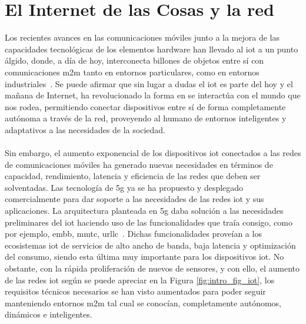 \section{El Internet de las Cosas y la red }
\label{sec:6gIoT}

Los recientes avances en las comunicaciones móviles junto a la mejora de las capacidades tecnológicas de los elementos hardware han llevado al \gls{iot} a un punto álgido, donde, a día de hoy, interconecta billones de objetos entre sí con comunicaciones \gls{m2m} tanto en entornos particulares, como en entornos industriales~\cite{Balaji2019}. Se puede afirmar que sin lugar a dudas el \gls{iot} es parte del hoy y el mañana de Internet, ha revolucionado la forma en se interactúa con el mundo que nos rodea, permitiendo conectar dispositivos entre sí de forma completamente autónoma a través de la red, proveyendo al humano de entornos inteligentes y adaptativos a las necesidades de la sociedad.\\
\\
Sin embargo, el aumento exponencial de los dispositivos \gls{iot} conectados a las redes de comunicaciones móviles ha generado nuevas necesidades en términos de capacidad, rendimiento, latencia y eficiencia de las redes que deben ser solventadas. Las tecnología de \gls{5g} ya se ha propuesto y desplegado comercialmente para dar soporte a las necesidades de las redes \gls{iot} y sus aplicaciones. La arquitectura planteada en \gls{5g} daba solución a las necesidades preliminares del \gls{iot} haciendo uso de las funcionalidades que traía consigo, como por ejemplo, \gls{embb}, \gls{mmtc}, \gls{urllc}~\cite{Li2018}. Dichas funcionalidades proveían a los ecosistemas \gls{iot} de servicios de alto ancho de banda, baja latencia y optimización del consumo, siendo esta última muy importante para los dispositivos \gls{iot}. No obstante, con la rápida proliferación de nuevos de sensores, y con ello, el aumento de las redes \gls{iot} según se puede apreciar en la Figura \ref{fig:intro_fig_iot}, los requisitos técnicos necesarios se han visto aumentados para poder seguir manteniendo entornos \gls{m2m} tal cual se conocían, completamente autónomos, dinámicos e inteligentes.


